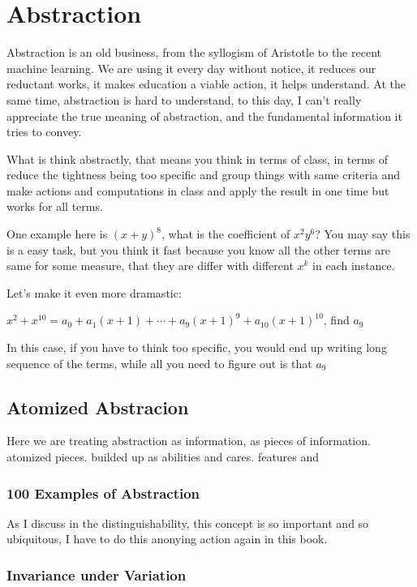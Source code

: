 %
\chapter{Abstraction}

Abstraction is an old business, from the syllogism of Aristotle to the recent machine learning. We are using it every day without notice, it reduces our reductant works, it makes education a viable action, it helps understand. At the same time, abstraction is hard to understand, to this day, I can't really appreciate the true meaning of abstraction, and the fundamental information it tries to convey.

What is think abstractly, that means you think in terms of class, in terms of reduce the tightness being too specific and group things with same criteria and make actions and computations in class and apply the result in one time but works for all terms.

One example here is $(x +y )^8$, what is the coefficient of $x^2y^6$? You may say this is a easy task, but you think it fast because you know all the other terms are same for some measure, that they are differ with different $x^k$ in each instance.

Let's make it even more dramastic:

\begin{example}
  $x^2 + x^10 = a_0 + a_1(x+1) + \cdots + a_9(x+1)^9 + a_10(x+1)^10$, find $a_9$
\end{example}

In this case, if you have to think too specific, you would end up writing long sequence of the terms, while all you need to figure out is that $a_9$

\section{Atomized Abstracion}

Here we are treating abstraction as information, as pieces of information. atomized pieces. builded up as abilities and cares. features and

\subsection*{100 Examples of Abstraction}

As I discuss in the distinguishability, this concept is so important and so ubiquitous, I have to do this anonying action again in this book.
\subsection*{Invariance under Variation}
